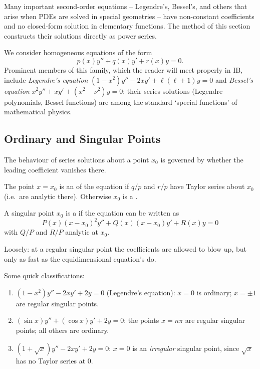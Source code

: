 Many important second-order equations -- Legendre's, Bessel's, and others that arise when PDEs are solved in special geometries -- have non-constant coefficients and no closed-form solution in elementary functions. The method of this section constructs their solutions directly as power series.

We consider homogeneous equations of the form
$$
p(x) y'' + q(x) y' + r(x) y = 0.
$$
Prominent members of this family, which the reader will meet properly in IB, include \emph{Legendre's equation} $(1 - x^2)y'' - 2xy' + \ell(\ell+1) y = 0$ and \emph{Bessel's equation} $x^2 y'' + xy' + (x^2 - \nu^2)y = 0$; their series solutions (Legendre polynomials, Bessel functions) are among the standard `special functions' of mathematical physics.

\subsection{Ordinary and Singular Points}

The behaviour of series solutions about a point $x_0$ is governed by whether the leading coefficient vanishes there.

\begin{definition}
	The point $x = x_0$ is an  of the equation if $q/p$ and $r/p$ have Taylor series about $x_0$ (i.e.\ are analytic there). Otherwise $x_0$ is a .

	A singular point $x_0$ is a  if the equation can be written as
	$$
	P(x) (x - x_0)^2 y'' + Q(x)(x - x_0) y' + R(x) y = 0
	$$
	with $Q/P$ and $R/P$ analytic at $x_0$.
\end{definition}

Loosely: at a regular singular point the coefficients are allowed to blow up, but only as fast as the equidimensional equation's do.

\begin{example}
	Some quick classifications:
	\begin{enumerate}[label=(\roman*)]
		\item $(1 - x^2)y'' - 2xy' + 2y = 0$ (Legendre's equation): $x = 0$ is ordinary; $x = \pm 1$ are regular singular points.
		\item $(\sin x) y'' + (\cos x) y' + 2y = 0$: the points $x = n\pi$ are regular singular points; all others are ordinary.
		\item $(1 + \sqrt x) y'' - 2xy' + 2y = 0$: $x = 0$ is an \emph{irregular} singular point, since $\sqrt x$ has no Taylor series at $0$.
	\end{enumerate}
\end{example}

